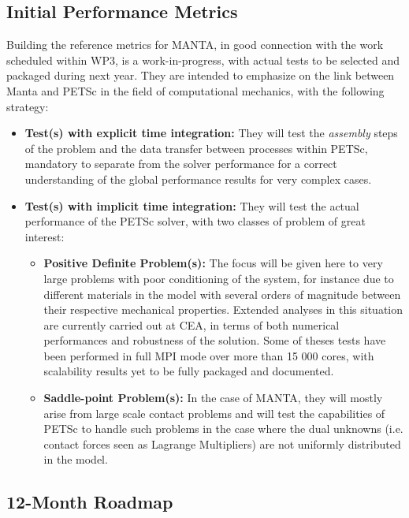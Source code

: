\subsection{Initial Performance Metrics}
\label{sec:WP3:MANTA:metrics}

Building the reference metrics for MANTA, in good connection with the work scheduled within WP3, is a work-in-progress, with actual tests to be selected and packaged during next year. They are intended to emphasize on the link between Manta and PETSc in the field of computational mechanics, with the following strategy:

\begin{itemize}
    \item \textbf{Test(s) with explicit time integration:} They will test the \textit{assembly} steps of the problem and the data transfer between processes within PETSc, mandatory to separate from the solver performance for a correct understanding of the global performance results for very complex cases.
    \item \textbf{Test(s) with implicit time integration:} They will test the actual  performance of the PETSc solver, with two classes of problem of great interest:
    \begin{itemize}
       \item \textbf{Positive Definite Problem(s):} The focus will be given here to very large problems with poor conditioning of the system, for instance due to different materials in the model with several orders of magnitude between their respective mechanical properties. Extended analyses in this situation are currently carried out at CEA, in terms of both numerical performances and robustness of the solution. Some of theses tests have been performed in full MPI mode over more than 15 000 cores, with scalability results yet to be fully packaged and documented.
       \item \textbf{Saddle-point Problem(s):} In the case of MANTA, they will mostly arise from large scale contact problems and will test the capabilities of PETSc to handle such problems in the case where the dual unknowns (i.e. contact forces seen as Lagrange Multipliers) are not uniformly distributed in the model.
    \end{itemize}
\end{itemize}


\subsection{12-Month Roadmap}
\label{sec:WP3:MANTA:roadmap}

